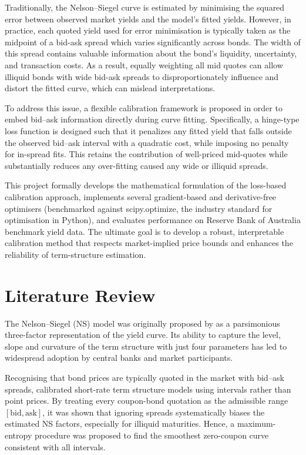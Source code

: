 \documentclass[12pt]{article}
\begin{document}
Traditionally, the Nelson–Siegel curve is estimated by minimising the squared error between observed market yields and the model’s fitted yields. However, in practice, each quoted yield used for error minimisation is typically taken as the midpoint of a bid-ask spread which varies significantly across bonds. The width of this spread contains valuable information about the bond's liquidity, uncertainty, and transaction costs. As a result, equally weighting all mid quotes can allow illiquid bonds with wide bid-ask spreads to disproportionately influence and distort the fitted curve, which can mislead interpretations.

To address this issue, a flexible calibration framework is proposed in order to embed bid–ask information directly during curve fitting. Specifically, a hinge-type loss function is designed such that it penalizes any fitted yield that falls outside the observed bid–ask interval with a quadratic cost, while imposing no penalty for in-spread fits. This retains the contribution of well-priced mid-quotes while substantially reduces any over-fitting caused any wide or illiquid spreads.

This project formally develops the mathematical formulation of the loss-based calibration approach, implements several gradient-based and derivative-free optimisers (benchmarked against scipy.optimize, the industry standard for optimisation in Python), and evaluates performance on Reserve Bank of Australia benchmark yield data. The ultimate goal is to develop a robust, interpretable calibration method that respects market-implied price bounds and enhances the reliability of term-structure estimation.

\section{Literature Review}\label{sec:lit-review}

The Nelson--Siegel (NS) model was originally proposed by \citet{NelsonSiegel1987} as a parsimonious three-factor representation of the yield curve.  
Its ability to capture the level, slope and curvature of the term structure with just four parameters has led to widespread adoption by central banks and market participants.

Recognising that bond prices are typically quoted in the market with bid–ask spreads, \citet{GomesGoncalvesGzylMayoral2017} calibrated short-rate term structure models using intervals rather than point prices.  
By treating every coupon-bond quotation as the admissible range \([\text{bid},\text{ask}]\), it was shown that ignoring spreads systematically biases the estimated NS factors, especially for illiquid maturities. Hence, a maximum-entropy procedure was proposed to find the smoothest zero-coupon curve consistent with all intervals.
\end{document}
